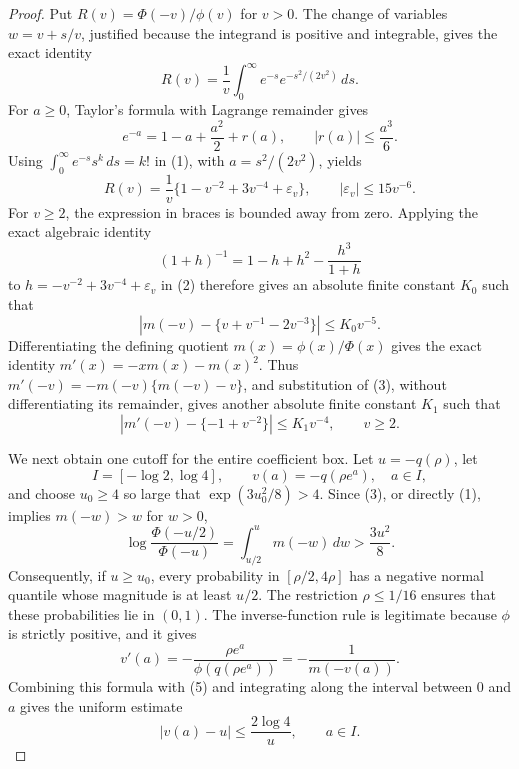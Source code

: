\documentclass{article}
\begin{document}
\begin{proof}
Put \(R(v)=\Phi(-v)/\phi(v)\) for \(v>0\).  The change of variables \(w=v+s/v\), justified because the integrand is positive and integrable, gives the exact identity
\[
R(v)=\frac{1}{v}\int_0^\infty e^{-s}e^{-s^2/(2v^2)}\,ds.
\tag{1}
\]
For \(a\geq0\), Taylor's formula with Lagrange remainder gives
\[
e^{-a}=1-a+\frac{a^2}{2}+r(a),
\qquad |r(a)|\leq \frac{a^3}{6}.
\]
Using \(\int_0^\infty e^{-s}s^k\,ds=k!\) in (1), with \(a=s^2/(2v^2)\), yields
\[
R(v)=\frac{1}{v}\{1-v^{-2}+3v^{-4}+\varepsilon_v\},
\qquad |\varepsilon_v|\leq15v^{-6}.
\tag{2}
\]
For \(v\geq2\), the expression in braces is bounded away from zero.  Applying the exact algebraic identity
\[
(1+h)^{-1}=1-h+h^2-\frac{h^3}{1+h}
\]
to \(h=-v^{-2}+3v^{-4}+\varepsilon_v\) in (2) therefore gives an absolute finite constant \(K_0\) such that
\[
\left|m(-v)-\{v+v^{-1}-2v^{-3}\}\right|\leq K_0v^{-5}.
\tag{3}
\]
Differentiating the defining quotient \(m(x)=\phi(x)/\Phi(x)\) gives the exact identity \(m'(x)=-xm(x)-m(x)^2\).  Thus \(m'(-v)=-m(-v)\{m(-v)-v\}\), and substitution of (3), without differentiating its remainder, gives another absolute finite constant \(K_1\) such that
\[
\left|m'(-v)-\{-1+v^{-2}\}\right|\leq K_1v^{-4},
\qquad v\geq2.
\tag{4}
\]

We next obtain one cutoff for the entire coefficient box.  Let \(u=-q(\rho)\), let
\[
I=[-\log2,\log4],
\qquad v(a)=-q(\rho e^a),\quad a\in I,
\]
and choose \(u_0\geq4\) so large that \(\exp(3u_0^2/8)>4\).  Since (3), or directly (1), implies \(m(-w)>w\) for \(w>0\),
\[
\log\frac{\Phi(-u/2)}{\Phi(-u)}
=\int_{u/2}^{u}m(-w)\,dw
>\frac{3u^2}{8}.
\tag{5}
\]
Consequently, if \(u\geq u_0\), every probability in \([\rho/2,4\rho]\) has a negative normal quantile whose magnitude is at least \(u/2\).  The restriction \(\rho\leq1/16\) ensures that these probabilities lie in \((0,1)\).  The inverse-function rule is legitimate because \(\phi\) is strictly positive, and it gives
\[
v'(a)=-\frac{\rho e^a}{\phi(q(\rho e^a))}
=-\frac{1}{m(-v(a))}.
\]
Combining this formula with (5) and integrating along the interval between \(0\) and \(a\) gives the uniform estimate
\[
|v(a)-u|\leq\frac{2\log4}{u},
\qquad a\in I.
\tag{6}
\]


\end{proof}
\end{document}
